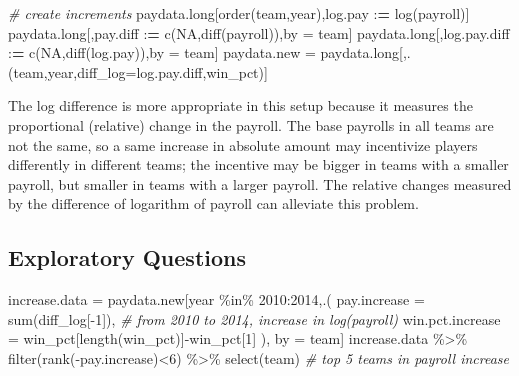 \documentclass[
  12pt,
]{article}
\newenvironment{Shaded}{\begin{snugshade}}{\end{snugshade}}
\newcommand{\AttributeTok}[1]{\textcolor[rgb]{0.77,0.63,0.00}{#1}}
\newcommand{\CommentTok}[1]{\textcolor[rgb]{0.56,0.35,0.01}{\textit{#1}}}
\newcommand{\ConstantTok}[1]{\textcolor[rgb]{0.00,0.00,0.00}{#1}}
\newcommand{\DecValTok}[1]{\textcolor[rgb]{0.00,0.00,0.81}{#1}}
\newcommand{\ErrorTok}[1]{\textcolor[rgb]{0.64,0.00,0.00}{\textbf{#1}}}
\newcommand{\FunctionTok}[1]{\textcolor[rgb]{0.00,0.00,0.00}{#1}}
\newcommand{\NormalTok}[1]{#1}
\newcommand{\OtherTok}[1]{\textcolor[rgb]{0.56,0.35,0.01}{#1}}
\newcommand{\SpecialCharTok}[1]{\textcolor[rgb]{0.00,0.00,0.00}{#1}}
\begin{document}
\begin{Shaded}
\begin{Highlighting}[]
\CommentTok{\# create increments}
\NormalTok{paydata.long[}\FunctionTok{order}\NormalTok{(team,year),log.pay }\SpecialCharTok{:}\ErrorTok{=} \FunctionTok{log}\NormalTok{(payroll)]}
\NormalTok{paydata.long[,pay.diff }\SpecialCharTok{:}\ErrorTok{=} \FunctionTok{c}\NormalTok{(}\ConstantTok{NA}\NormalTok{,}\FunctionTok{diff}\NormalTok{(payroll)),by }\OtherTok{=}\NormalTok{ team]}
\NormalTok{paydata.long[,log.pay.diff }\SpecialCharTok{:}\ErrorTok{=} \FunctionTok{c}\NormalTok{(}\ConstantTok{NA}\NormalTok{,}\FunctionTok{diff}\NormalTok{(log.pay)),by }\OtherTok{=}\NormalTok{ team]}
\NormalTok{paydata.new }\OtherTok{=}\NormalTok{ paydata.long[,.(team,year,}\AttributeTok{diff\_log=}\NormalTok{log.pay.diff,win\_pct)]}
\end{Highlighting}
\end{Shaded}

The log difference is more appropriate in this setup because it measures
the proportional (relative) change in the payroll. The base payrolls in
all teams are not the same, so a same increase in absolute amount may
incentivize players differently in different teams; the incentive may be
bigger in teams with a smaller payroll, but smaller in teams with a
larger payroll. The relative changes measured by the difference of
logarithm of payroll can alleviate this problem.

\hypertarget{exploratory-questions}{%
\subsection{Exploratory Questions}\label{exploratory-questions}}

\begin{Shaded}
\begin{Highlighting}[]
\NormalTok{increase.data }\OtherTok{=}\NormalTok{ paydata.new[year }\SpecialCharTok{\%in\%} \DecValTok{2010}\SpecialCharTok{:}\DecValTok{2014}\NormalTok{,.(}
  \AttributeTok{pay.increase =} \FunctionTok{sum}\NormalTok{(diff\_log[}\SpecialCharTok{{-}}\DecValTok{1}\NormalTok{]), }\CommentTok{\# from 2010 to 2014, increase in log(payroll)}
  \AttributeTok{win.pct.increase =}\NormalTok{ win\_pct[}\FunctionTok{length}\NormalTok{(win\_pct)]}\SpecialCharTok{{-}}\NormalTok{win\_pct[}\DecValTok{1}\NormalTok{] }
\NormalTok{), by }\OtherTok{=}\NormalTok{ team]}
\NormalTok{increase.data }\SpecialCharTok{\%\textgreater{}\%}
  \FunctionTok{filter}\NormalTok{(}\FunctionTok{rank}\NormalTok{(}\SpecialCharTok{{-}}\NormalTok{pay.increase)}\SpecialCharTok{\textless{}}\DecValTok{6}\NormalTok{) }\SpecialCharTok{\%\textgreater{}\%}
  \FunctionTok{select}\NormalTok{(team) }\CommentTok{\# top 5 teams in payroll increase}
\end{Highlighting}
\end{Shaded}
\end{document}
